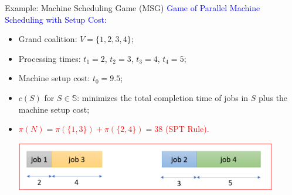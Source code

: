 \documentclass[14pt]{beamer}
\begin{document}
\begin{frame}{Example: Machine Scheduling Game (MSG)}
\small
\textcolor{blue}{Game of Parallel Machine Scheduling with Setup Cost:}
\vspace{2mm}
	\begin{itemize}
	\justifying
		\item Grand coalition: $V = \big\{ 1,2,3,4 \big\}$;
		\item Processing times: $t_1=2$, $t_2=3$, $t_3=4$, $t_4=5$;
		\item Machine setup cost: $t_0 = 9.5$;
		\item $c(S)$ for $S\in \mathbb{S}$:  minimizes the total completion time of jobs in $S$ plus the machine setup cost;
		\item \textcolor{red}{$\pi(N)= \pi(\{1,3\}) + \pi(\{2,4\})= 38$ (SPT Rule).}

\centering
\hspace{-1cm}
\includegraphics[width = 0.9\textwidth]{Figures/m1.png}

\end{itemize}
\end{frame}
\end{document}
